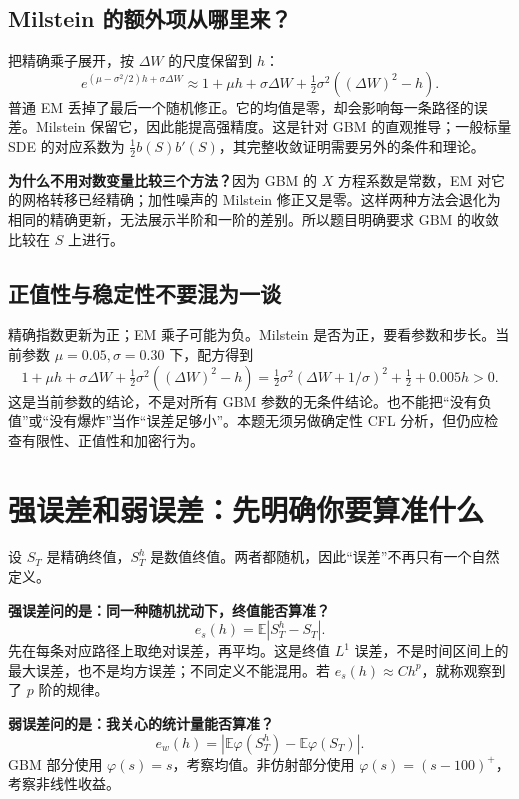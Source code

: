 \documentclass[11pt,a4paper,fontset=none]{ctexart}
\newcommand{\E}{\mathbb E}
\begin{document}
\subsection*{Milstein 的额外项从哪里来？}
把精确乘子展开，按 $\Delta W$ 的尺度保留到 $h$：
\[
e^{(\mu-\sigma^2/2)h+\sigma\Delta W}
\approx 1+\mu h+\sigma\Delta W
 +\tfrac12\sigma^2((\Delta W)^2-h).
\]
普通 EM 丢掉了最后一个随机修正。它的均值是零，却会影响每一条路径的误差。Milstein 保留它，因此能提高强精度。这是针对 GBM 的直观推导；一般标量 SDE 的对应系数为 $\tfrac12 b(S)b'(S)$，其完整收敛证明需要另外的条件和理论。

\textbf{为什么不用对数变量比较三个方法？}因为 GBM 的 $X$ 方程系数是常数，EM 对它的网格转移已经精确；加性噪声的 Milstein 修正又是零。这样两种方法会退化为相同的精确更新，无法展示半阶和一阶的差别。所以题目明确要求 GBM 的收敛比较在 $S$ 上进行。

\subsection*{正值性与稳定性不要混为一谈}
精确指数更新为正；EM 乘子可能为负。Milstein 是否为正，要看参数和步长。当前参数 $\mu=0.05,\sigma=0.30$ 下，配方得到
\[
1+\mu h+\sigma\Delta W+\tfrac12\sigma^2((\Delta W)^2-h)
=\tfrac12\sigma^2(\Delta W+1/\sigma)^2+\tfrac12+0.005h>0.
\]
这是当前参数的结论，不是对所有 GBM 参数的无条件结论。也不能把“没有负值”或“没有爆炸”当作“误差足够小”。本题无须另做确定性 CFL 分析，但仍应检查有限性、正值性和加密行为。

\newpage
\section{强误差和弱误差：先明确你要算准什么}\label{sec:errors}
设 $S_T$ 是精确终值，$S_T^h$ 是数值终值。两者都随机，因此“误差”不再只有一个自然定义。

\textbf{强误差问的是：同一种随机扰动下，终值能否算准？}
\begin{equation}\label{eq:strong}
e_s(h)=\E|S_T^h-S_T|.
\end{equation}
先在每条对应路径上取绝对误差，再平均。这是终值 $L^1$ 误差，不是时间区间上的最大误差，也不是均方误差；不同定义不能混用。若 $e_s(h)\approx Ch^p$，就称观察到了 $p$ 阶的规律。

\textbf{弱误差问的是：我关心的统计量能否算准？}
\begin{equation}\label{eq:weak}
e_w(h)=\left|\E\varphi(S_T^h)-\E\varphi(S_T)\right|.
\end{equation}
GBM 部分使用 $\varphi(s)=s$，考察均值。非仿射部分使用 $\varphi(s)=(s-100)^+$，考察非线性收益。
\end{document}
